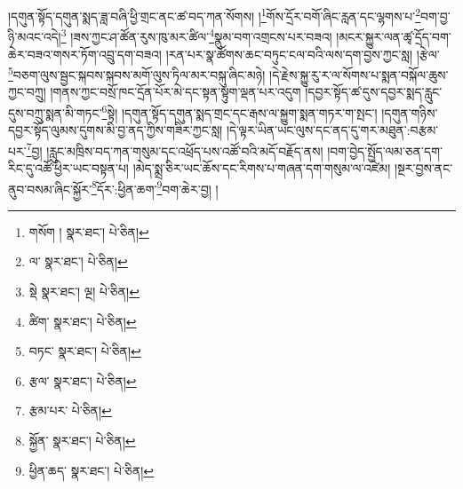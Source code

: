 །དགུན་སྟོད་དགུན་སྨད་ཟླ་བཞི་ཕྱི་གྲང་ནང་ཚ་བད་ཀན་སོགས། །\footnote{གསོག །  སྣར་ཐང་།  པེ་ཅིན། }གོས་དྲོར་བགོ་ཞིང་རླན་དང་ལྷགས་པ་\footnote{ལ་  སྣར་ཐང་།  པེ་ཅིན། }བག་བྱ་ཉི་མའང་འདེ།\footnote{སྡེ  སྣར་ཐང་། ལྔ།  པེ་ཅིན། } །ཟས་ཀྱང་ཤ་ཚོན་རུས་ཁུ་མར་ཚིལ་\footnote{ཚིག་  སྣར་ཐང་།  པེ་ཅིན། }སྣུམ་བག་འགྲངས་པར་བཟའ། །མངར་སྐྱུར་ལན་ཚྭ་དྲོད་བག་ཆེར་བཟའ་གསར་ཏོག་འབྲུ་དག་བཟའ། །རན་པར་སྣ་ཚོགས་ཆང་བཏུང་ངལ་བའི་ལས་དག་བྱས་ཀྱང་སླ། །རྩེལ་\footnote{བཏང་  སྣར་ཐང་།  པེ་ཅིན། }བཅག་ལུས་སྦྱང་སྐབས་སྐབས་མགོ་ལུས་ཏིལ་མར་བསྐུ་ཞིང་མཉེ། །དེ་རྗེས་སྐྱུ་རུ་ར་ལ་སོགས་པ་སྨན་བསྐོལ་ཆུས་ཀྱང་བཀྲུ། །གནས་ཀྱང་བསྲོ་ཁང་དྲོན་པོར་མེ་དང་སྟན་སྟུག་ལྡན་པར་འདུག །དབྱར་སྟོད་ཚ་དུས་དབྱར་སྨད་རླུང་དུས་བཀྲུ་སྨན་མི་གཏང་\footnote{རྩལ་  སྣར་ཐང་།  པེ་ཅིན། }སྟེ། །དགུན་སྟོད་དགུན་སྨད་གྲང་དང་རྒས་ལ་སྐྱུག་སྨན་གཏར་ག་སྤང་། །དགུན་གཉིས་དབྱར་སྟོད་ལུམས་དུགས་མི་བྱ་ནད་ཀྱིས་གཟིར་ཀྱང་སླ། །དེ་ལྟར་ཡིན་ཡང་ལུས་དང་ནད་དུ་གར་མཐུན་:བརྩམ་པར་\footnote{རྩམ་པར་  པེ་ཅིན། }བྱ། །རླུང་མཁྲིས་བད་ཀན་གསུམ་དང་འཕྲོད་པས་འཚོ་བའི་མདོ་བརྗོད་ནས། །བག་བྱེད་སྤྱོད་ལམ་ཅན་དག་རིང་དུ་འཚོ་ཕྱིར་ཡང་བསྟན་པ། །མེད་སྨྲ་ཅིར་ཡང་ཆོས་དང་རིགས་པ་གཞན་དག་གསུམ་ལ་འཛེམ། །སྔར་བྱས་ནང་ནུབ་བསམ་ཞིང་སྐྱོར་\footnote{སྐྱོན་  སྣར་ཐང་།  པེ་ཅིན། }དོར་:ཕྱིན་ཆག་\footnote{ཕྱིན་ཆད་  སྣར་ཐང་།  པེ་ཅིན། }བག་ཆེར་བྱ། །
